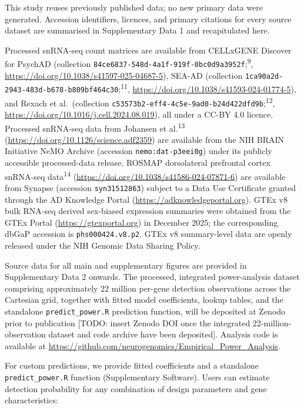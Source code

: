 \documentclass[
]{article}
\begin{document}
This study reuses previously published data; no new primary data were
generated. Accession identifiers, licences, and primary citations for
every source dataset are summarised in Supplementary Data 1 and
recapitulated here.

Processed snRNA-seq count matrices are available from CELLxGENE Discover
for PsychAD (collection
\texttt{84ce6837-548d-4a1f-919f-0bc0d9a3952f};\textsuperscript{9},
\url{https://doi.org/10.1038/s41597-025-04687-5}), SEA-AD (collection
\texttt{1ca90a2d-2943-483d-b678-b809bf464c30};\textsuperscript{11},
\url{https://doi.org/10.1038/s41593-024-01774-5}), and Rexach et
al.~(collection
\texttt{c53573b2-eff4-4c5e-9ad0-b24d422dfd9b};\textsuperscript{12},
\url{https://doi.org/10.1016/j.cell.2024.08.019}), all under a CC-BY 4.0
licence. Processed snRNA-seq data from Johansen et
al.\textsuperscript{13} (\url{https://doi.org/10.1126/science.adf2359})
are available from the NIH BRAIN Initiative NeMO Archive (accession
\texttt{nemo:dat-p3eei0g}) under its publicly accessible processed-data
release. ROSMAP dorsolateral prefrontal cortex snRNA-seq
data\textsuperscript{14}
(\url{https://doi.org/10.1038/s41586-024-07871-6}) are available from
Synapse (accession \texttt{syn31512863}) subject to a Data Use
Certificate granted through the AD Knowledge Portal
(\url{https://adknowledgeportal.org}). GTEx v8 bulk RNA-seq derived
sex-biased expression summaries were obtained from the GTEx Portal
(\url{https://gtexportal.org}) in December 2025; the corresponding dbGaP
accession is \texttt{phs000424.v8.p2}. GTEx v8 summary-level data are
openly released under the NIH Genomic Data Sharing Policy.

Source data for all main and supplementary figures are provided in
Supplementary Data 2 onwards. The processed, integrated power-analysis
dataset comprising approximately 22 million per-gene detection
observations across the Cartesian grid, together with fitted model
coefficients, lookup tables, and the standalone
\texttt{predict\_power.R} prediction function, will be deposited at
Zenodo prior to publication {[}TODO: insert Zenodo DOI once the
integrated 22-million-observation dataset and code archive have been
deposited{]}. Analysis code is available at
\url{https://github.com/neurogenomics/Empirical_Power_Analysis}.

For custom predictions, we provide fitted coefficients and a standalone
\texttt{predict\_power.R} function (Supplementary Software). Users can
estimate detection probability for any combination of design parameters
and gene characteristics:
\end{document}
